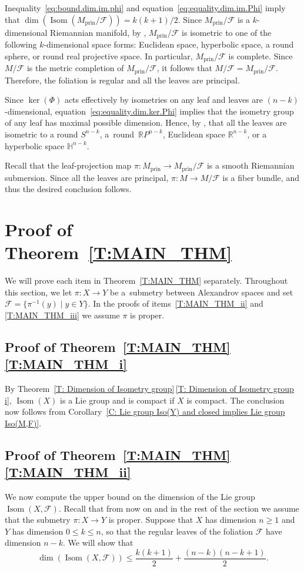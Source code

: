 \documentclass[10pt,a4paper]{amsart}
\numberwithin{equation}{section}
\theoremstyle{definition}
\DeclareMathOperator{\Iso}{Isom}
\newcommand{\R}{\mathbb{R}} %
\newcommand{\Sp}{S} %
\newcommand{\RP}{\mathbb{R}P} %
\newcommand{\prin}{\mathrm{prin}}
\newcommand{\fol}{\mathcal{F}}
\newcommand{\p}{\pi}
\begin{document}
Inequality~\eqref{eq:bound.dim.im.phi} and equation~\eqref{eq:equality.dim.im.Phi} imply that
$
\dim(\Iso(M_\prin/\fol)) = k(k+1)/2$.
Since $M_\prin/\fol$ is a $k$-dimensional Riemannian manifold, by \cite[Chapter~II, Theorem 3.1]{Kobayashi}, $M_\prin/\fol$ is isometric to one of the following $k$-dimensional space forms: Euclidean space, hyperbolic space, a round sphere, or round real projective space. In particular, $M_\prin/\fol$ is complete. Since $M/\fol$ is the metric completion of $M_\prin/\fol$, it follows that $M/\fol = M_\prin/\fol$. Therefore, the foliation is regular and all the leaves are principal.

Since $\ker(\Phi)$ acts effectively by isometries on any leaf and leaves are $(n-k)$-dimensional, equation~\eqref{eq:equality.dim.ker.Phi} implies that the isometry group of any leaf has maximal possible dimension. Hence, by \cite[Chapter~II, Theorem~3.1]{Kobayashi}, that all the leaves are isometric to a round $\Sp^{n-k}$, a~round~$\RP^{n-k}$, Euclidean space $\R^{n-k}$, or a hyperbolic space $\mathbb{H}^{n-k}$.

Recall that the leaf-projection map $\pi\colon M_{\prin}\to M_{\prin}/\fol$ is a smooth Riemannian submersion.
Since all the leaves are principal, $\pi\colon M\to M/\fol$ is a fiber bundle, and thus the desired conclusion follows.

\section[Proof of Theorem B]{Proof of Theorem~\ref{T:MAIN_THM}}\label{S:PROOF_MAIN_THM}
	
We will prove each item in Theorem~\ref{T:MAIN_THM} separately. Throughout this section, we let $\pi\colon X\to Y$ be a~submetry between Alexandrov spaces and set $\fol = \big\{\p^{-1}(y)\mid y\in Y\big\}$. In the proofs of items~\ref{T:MAIN_THM_ii} and \ref{T:MAIN_THM_iii} we assume $\pi$ is proper.


\subsection[Proof of Theorem B (i)]{Proof of Theorem~\ref{T:MAIN_THM}\,\ref{T:MAIN_THM_i}}
By Theorem~\ref{T: Dimension of Isometry group}\,\ref{T: Dimension of Isometry group i}, $\Iso(X)$ is a Lie group and is compact if $X$ is compact. The conclusion now follows from Corollary~\ref{C: Lie group Iso(Y) and closed implies Lie group Iso(M,F)}.

\subsection[Proof of Theorem B (ii)]{Proof of Theorem~\ref{T:MAIN_THM}\,\ref{T:MAIN_THM_ii}}
We now compute the upper bound on the dimension of the Lie group $\Iso(X,\fol)$. Recall that from now on and in the rest of the section we assume that the submetry $\pi\colon X\to Y$ is proper.
Suppose that $X$ has dimension $n\geq 1$ and $Y$ has dimension $0\leq k \leq n$, so that the regular leaves of the foliation $\fol$ have dimension $n-k$. We will show that
\[%
 	\dim(\Iso(X,\fol)) \leq \frac{k(k+1)}{2}+\frac{(n-k)(n-k+1)}{2}.
\]
\end{document}
